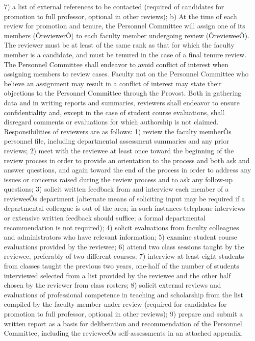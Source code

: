 \documentclass[letterpaper, 11pt]{article}
\begin{document}
	7) a list of external references to be contacted (required of candidates for promotion to full professor, optional in other reviews);
	b) At the time of each review for promotion and tenure, the Personnel Committee will assign one of its members (ÒreviewerÓ) to each faculty member undergoing review (ÒrevieweeÓ).  The reviewer must be at least of the same rank as that for which the faculty member is a candidate, and must be tenured in the case of a final tenure review.  The Personnel Committee shall endeavor to avoid conflict of interest when assigning members to review cases.  Faculty not on the Personnel Committee who believe an assignment may result in a conflict of interest may state their objections to the Personnel Committee through the Provost.  Both in gathering data and in writing reports and summaries, reviewers shall endeavor to ensure confidentiality and, except in the case of student course evaluations, shall disregard comments or evaluations for which authorship is not claimed.  Responsibilities of reviewers are as follows:
	1) review the faculty memberÕs personnel file, including departmental assessment summaries and any prior reviews;
	2) meet with the reviewee at least once toward the beginning of the review process in order to provide an orientation to the process and both ask and answer questions, and again toward the end of the process in order to address any issues or concerns raised during the review process and to ask any follow-up questions;
	3) solicit written feedback from and interview each member of a revieweeÕs department (alternate means of soliciting input may be required if a departmental colleague is out of the area; in such instances telephone interviews or extensive written feedback should suffice; a formal departmental recommendation is not required);
	4) solicit evaluations from faculty colleagues and administrators who have relevant information;
	5) examine student course evaluations provided by the reviewee;
	6) attend two class sessions taught by the reviewee, preferably of two different courses;
	7) interview at least eight students from classes taught the previous two years, one-half of the number of students interviewed selected from a list provided by the reviewee and the other half chosen by the reviewer from class rosters;
	8) solicit external reviews and evaluations of professional competence in teaching and scholarship from the list compiled by the faculty member under review (required for candidates for promotion to full professor, optional in other reviews);
	9) prepare and submit a written report as a basis for deliberation and recommendation of the Personnel Committee, including the revieweeÕs self-assessments in an attached appendix.
\end{document}
